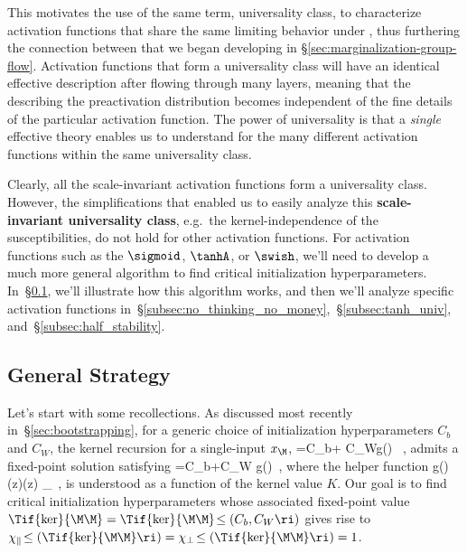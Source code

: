 This motivates the use of the same term, universality class, to characterize activation functions that share the same limiting behavior under , thus furthering the connection between  that we began developing in \S\ref{sec:marginalization-group-flow}. Activation functions that form a universality class will have an identical effective description after flowing through many layers, meaning that the  describing the preactivation distribution becomes independent of the fine details of the particular activation function. The power of universality is that a \emph{single} effective theory enables us to understand  for the many different activation functions within the same universality class.

Clearly, all the scale-invariant activation functions form a universality class. However, the simplifications that enabled us to easily analyze this \textbf{scale-invariant universality class}, e.g.~the kernel-independence of the susceptibilities, do not hold  for
other activation functions.
For activation functions such as the $\sigmoid$, $\tanhA$, or $\swish$, we'll need to develop a much more general algorithm to find critical initialization hyperparameters. 
In~\S\ref{subsec:strategize}, we'll illustrate how this algorithm works, and then we'll analyze specific activation functions in~\S\ref{subsec:no_thinking_no_money},~\S\ref{subsec:tanh_univ}, and~\S\ref{subsec:half_stability}. 











\subsection{General Strategy}\label{subsec:strategize}
Let's start with some recollections. As discussed most recently in~\S\ref{sec:bootstrapping}, for a generic choice of initialization hyperparameters $C_b$ and $C_W$, the kernel recursion for a single-input $x_\M$,
\be\label{eq:kernel_rec}
 =C_b+ C_Wg\!\le(\Ti{\ker}{\M\M}{\ell}\ri) \, ,
\ee
admits a fixed-point solution satisfying
\be\label{eq:kernel_fixed_eq}
\Tif{\ker}{\M\M}=C_b+C_W g\!\le(\Tif{\ker}{\M\M}\ri)\, ,
\ee
where the helper function
\be\label{eq:helper-function-general-strategy}
 g\!\le(\ker\ri)\equiv \bra\sigma(z)\sigma(z) \ket_{\ker}\, ,
\ee
is understood as a function of the kernel value $K$. Our goal is to find critical initialization hyperparameters whose associated fixed-point value $\Tif{\ker}{\M\M}=\Tif{\ker}{\M\M}\!\le(C_b,C_W\ri)$ gives rise to $\chi_{\parallel}\!\le(\Tif{\ker}{\M\M}\ri)=\chi_{\perp}\!\le(\Tif{\ker}{\M\M}\ri)=1$.









